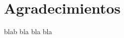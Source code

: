 \vspace{2cm}
\chapter*{Agradecimientos}

\pagestyle{fancy}
\vspace{-10mm}

\hspace{12pt}

blab
bla 
bla
bla
\bigskip



